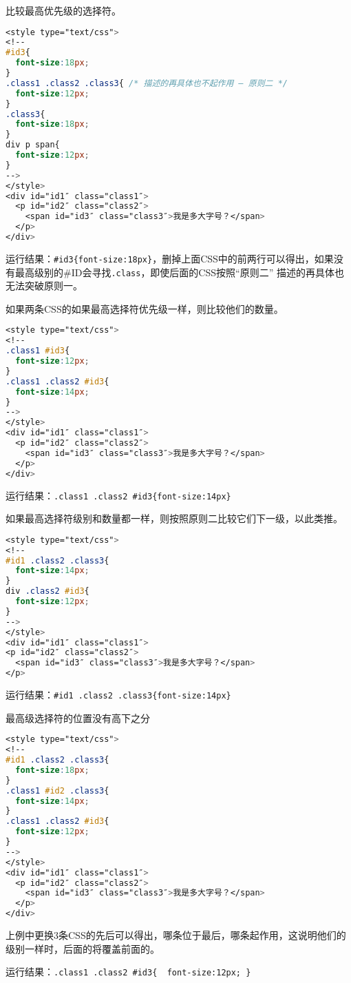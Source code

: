 \begin{compactenum}
\item 比较最高优先级的选择符。

\begin{lstlisting}[language=CSS]
<style type="text/css">
<!--
#id3{
  font-size:18px;
}
.class1 .class2 .class3{ /* 描述的再具体也不起作用 — 原则二 */
  font-size:12px; 
} 
.class3{
  font-size:18px;
}
div p span{
  font-size:12px;
}
-->
</style>
<div id="id1″ class="class1″>
  <p id="id2″ class="class2″>
    <span id="id3″ class="class3″>我是多大字号？</span>
  </p>
</div>
\end{lstlisting}

运行结果：\verb|#id3{font-size:18px}|，删掉上面CSS中的前两行可以得出，如果没有最高级别的\#ID会寻找\texttt{.class}，即使后面的CSS按照“原则二” 描述的再具体也无法突破原则一。



\item 如果两条CSS的如果最高选择符优先级一样，则比较他们的数量。

\begin{lstlisting}[language=CSS]
<style type="text/css">
<!--
.class1 #id3{
  font-size:12px;
}
.class1 .class2 #id3{
  font-size:14px;
}
-->
</style>
<div id="id1″ class="class1″>
  <p id="id2″ class="class2″>
    <span id="id3″ class="class3″>我是多大字号？</span>
  </p>
</div>
\end{lstlisting}


运行结果：\verb|.class1 .class2 #id3{font-size:14px}|

\item 如果最高选择符级别和数量都一样，则按照原则二比较它们下一级，以此类推。

\begin{lstlisting}[language=CSS]
<style type="text/css">
<!--
#id1 .class2 .class3{
  font-size:14px;
}
div .class2 #id3{
  font-size:12px;
}
-->
</style>
<div id="id1″ class="class1″>
<p id="id2″ class="class2″>
  <span id="id3″ class="class3″>我是多大字号？</span>
</p>
\end{lstlisting}

运行结果：\verb|#id1 .class2 .class3{font-size:14px}|

\item 最高级选择符的位置没有高下之分

\begin{lstlisting}[language=CSS]
<style type="text/css">
<!--
#id1 .class2 .class3{
  font-size:18px;
}
.class1 #id2 .class3{
  font-size:14px;
}
.class1 .class2 #id3{
  font-size:12px;
}
-->
</style>
<div id="id1″ class="class1″>
  <p id="id2″ class="class2″>
    <span id="id3″ class="class3″>我是多大字号？</span>
  </p>
</div>
\end{lstlisting}



上例中更换3条CSS的先后可以得出，哪条位于最后，哪条起作用，这说明他们的级别一样时，后面的将覆盖前面的。

运行结果：\verb|.class1 .class2 #id3{  font-size:12px; }|

\end{compactenum}


